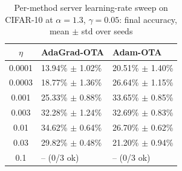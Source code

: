 \begin{table}[!htbp]
    \centering
    \small
    \caption{Per-method server learning-rate sweep on CIFAR-10 at $\alpha=1.3$, $\gamma=0.05$: final accuracy, mean $\pm$ std over seeds}
    \label{tab:lr-sweep}
    \begin{tabular}{c|p{}p{}}
        \hline
        $\eta$ & AdaGrad-OTA & Adam-OTA \\
        \hline
        0.0001 & 13.94\% $\pm$ 1.02\% & 20.51\% $\pm$ 1.40\% \\
        0.0003 & 18.77\% $\pm$ 1.36\% & 26.64\% $\pm$ 1.15\% \\
        0.001 & 25.33\% $\pm$ 0.88\% & 33.65\% $\pm$ 0.85\% \\
        0.003 & 32.28\% $\pm$ 1.24\% & 32.69\% $\pm$ 0.83\% \\
        0.01 & 34.62\% $\pm$ 0.64\% & 26.70\% $\pm$ 0.62\% \\
        0.03 & 29.82\% $\pm$ 0.48\% & 21.20\% $\pm$ 0.94\% \\
        0.1 & -- (0/3 ok) & -- (0/3 ok) \\
        \hline
    \end{tabular}
\end{table}

